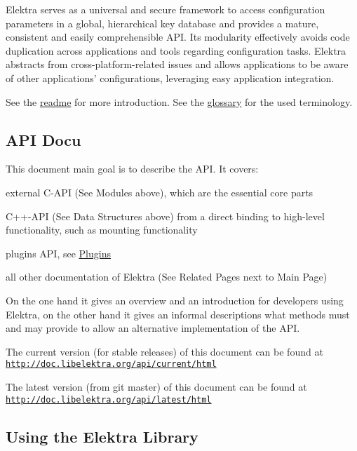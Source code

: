 Elektra serves as a universal and secure framework to access configuration parameters in a global, hierarchical key database and provides a mature, consistent and easily comprehensible A\+P\+I. Its modularity effectively avoids code duplication across applications and tools regarding configuration tasks. Elektra abstracts from cross-\/platform-\/related issues and allows applications to be aware of other applications' configurations, leveraging easy application integration.

See the \hyperlink{README_md}{readme} for more introduction. See the \hyperlink{md_doc_help_elektra-glossary_doc_help_elektra-glossary_md}{glossary} for the used terminology.

\subsection*{A\+P\+I Docu}

This document main goal is to describe the A\+P\+I. It covers\+:


\begin{DoxyItemize}
\item external C-\/\+A\+P\+I (See Modules above), which are the essential core parts
\item C++-\/\+A\+P\+I (See Data Structures above) from a direct binding to high-\/level functionality, such as mounting functionality
\item plugins A\+P\+I, see \hyperlink{group__plugin}{Plugins}
\item all other documentation of Elektra (See Related Pages next to Main Page)
\end{DoxyItemize}

On the one hand it gives an overview and an introduction for developers using Elektra, on the other hand it gives an informal descriptions what methods must and may provide to allow an alternative implementation of the A\+P\+I.

The current version (for stable releases) of this document can be found at \href{http://doc.libelektra.org/api/current/html}{\tt http\+://doc.\+libelektra.\+org/api/current/html}

The latest version (from git master) of this document can be found at \href{http://doc.libelektra.org/api/latest/html}{\tt http\+://doc.\+libelektra.\+org/api/latest/html}

\subsection*{Using the Elektra Library}

